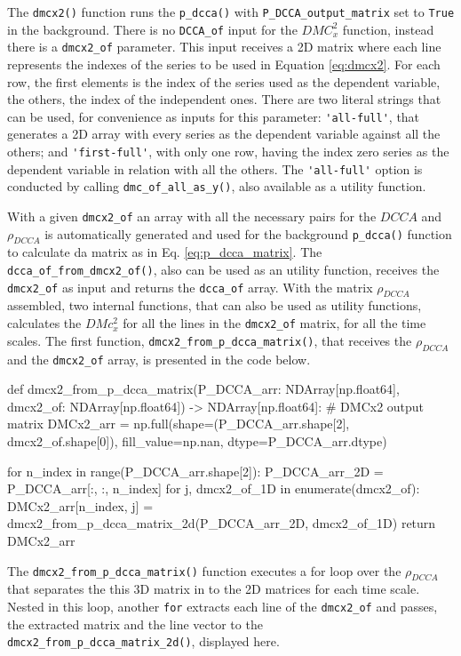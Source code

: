 \documentclass[nojss]{jss}
\begin{document}
The \verb"dmcx2()" function runs the \verb"p_dcca()" with \verb"P_DCCA_output_matrix" set to \verb"True" in the background. There is no \verb"DCCA_of" input for the $DMC_x^2$ function, instead there is a \verb"dmcx2_of" parameter. This input receives a 2D matrix where each line represents the indexes of the series to be used in Equation \ref{eq:dmcx2}. For each row, the first elements is the index of the series used as the dependent variable, the others, the index of the independent ones. There are two literal strings that can be used, for convenience as inputs for this parameter: \verb"'all-full'", that generates a 2D array with every series as the dependent variable against all the others; and \verb"'first-full'", with only one row, having the index zero series as the dependent variable in relation with all the others. The \verb"'all-full'" option is conducted by calling \verb"dmc_of_all_as_y()", also available as a utility function.

With a given \verb"dmcx2_of" an array with all the necessary pairs for the $DCCA$ and $\rho_{DCCA}$ is automatically generated and used for the background \verb"p_dcca()" function to calculate da matrix as in Eq. \ref{eq:p_dcca_matrix}. The \verb"dcca_of_from_dmcx2_of()", also can be used as an utility function, receives the  \verb"dmcx2_of" as input and returns the \verb"dcca_of" array. With the matrix $\rho_{DCCA}$ assembled, two internal functions, that can also be used as utility functions, calculates the $DMc_{x}^2$ for all the lines in the \verb"dmcx2_of" matrix, for all the time scales. The first function, \verb"dmcx2_from_p_dcca_matrix()", that receives the $\rho_{DCCA}$ and the \verb"dmcx2_of" array, is presented in the code below.

\begin{Code}
def dmcx2_from_p_dcca_matrix(P_DCCA_arr: NDArray[np.float64], 
      dmcx2_of: NDArray[np.float64]) -> NDArray[np.float64]:   
    # DMCx2 output matrix
    DMCx2_arr = np.full(shape=(P_DCCA_arr.shape[2], dmcx2_of.shape[0]),
    fill_value=np.nan, dtype=P_DCCA_arr.dtype)

    for n_index in range(P_DCCA_arr.shape[2]):
        P_DCCA_arr_2D = P_DCCA_arr[:, :, n_index]
        for j,  dmcx2_of_1D in enumerate(dmcx2_of):
            DMCx2_arr[n_index, j] = dmcx2_from_p_dcca_matrix_2d(P_DCCA_arr_2D,
                                                                dmcx2_of_1D)
    return DMCx2_arr
\end{Code}

The \verb"dmcx2_from_p_dcca_matrix()" function executes a for loop over the $\rho_{DCCA}$ that separates the this 3D matrix in to the 2D matrices for each time scale. Nested in this loop, another \verb"for" extracts each line of the \verb"dmcx2_of" and passes, the extracted matrix and the line vector to the \verb"dmcx2_from_p_dcca_matrix_2d()", displayed here.
\end{document}

